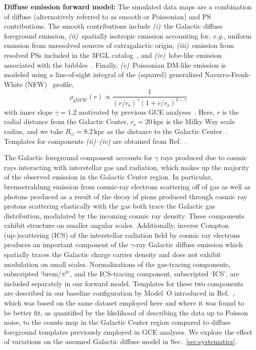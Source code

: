 \documentclass[prd,aps,10pt,nofootinbib,twocolumn,superscriptaddress,preprintnumbers,balancelastpage,longbibliography]{revtex4-1}
\begin{document}
\noindent
\textbf{Diffuse emission forward model:} The simulated data maps are a combination of diffuse (alternatively referred to as smooth or Poissonian) and PS contributions. The smooth contributions include \emph{(i)}~the Galactic diffuse foreground emission, \emph{(ii)}~spatially isotropic emission accounting for, \emph{e.g.}, uniform emission from unresolved sources of extragalactic origin, \emph{(iii)}~emission from resolved PSs included in the \Fermi 3FGL catalog~\cite{Fermi-LAT:2015bhf}, and \emph{(iv)}~lobe-like emission associated with the \Fermi bubbles~\cite{Su:2010qj}. Finally, \emph{(v)}~Poissonian DM-like emission is modeled using a line-of-sight integral of the (squared) generalized Navarro-Frenk-White (NFW)~\cite{Navarro:1995iw,Navarro:1996gj} profile,
\begin{equation}
\label{eq:nfw}
\rho_\mathrm{gNFW}(r) \propto \frac{1}{\left(r / r_{\mathrm s}\right)^{\gamma}\left(1+r / r_{\mathrm s}\right)^{3-\gamma}}
\end{equation}
with inner slope $\gamma=1.2$ motivated by previous GCE analyses~\cite{Gordon:2013vta,Daylan:2014rsa,Zhou:2014lva}. Here, $r$ is the radial distance from the Galactic Center, $r_{\mathrm s}=20\,\mathrm{kpc}$ is the Milky Way scale radius, and we take $R_\odot = 8.2\,\mathrm{kpc}$ as the distance to the Galactic Center~\cite{2020arXiv201202169B,2019A&A...625L..10G}. Templates for components \emph{(ii)--(iv)} are obtained from Ref.~\cite{Mishra-Sharma:2016gis}. 

The Galactic foreground component accounts for $\gamma$ rays produced due to cosmic rays interacting with interstellar gas and radiation, which makes up the majority of the observed emission in the Galactic Center region. In particular, bremsstrahlung emission from cosmic-ray electrons scattering off of gas as well as photons produced as a result of the decay of pions produced through cosmic ray protons scattering elastically with the gas both trace the Galactic gas distribution, modulated by the incoming cosmic ray density. These components exhibit structure on smaller angular scales. Additionally, inverse Compton (up-)scattering (ICS) of the interstellar radiation field by cosmic ray electrons produces an important component of the $\gamma$-ray Galactic diffuse emission which spatially traces the Galactic charge carrier density and does not exhibit modulation on small scales. Normalizations of the gas-tracing components, subscripted `brem/$\pi^0$', and the ICS-tracing component, subscripted `ICS', are included separately in our forward model. Templates for these two components are described in our baseline configuration by {Model~O} introduced in Ref.~\cite{Buschmann:2020adf}, which was based on the same \Fermi dataset employed here and where it was found to be better fit, as quantified by the likelihood of describing the data up to Poisson noise, to the counts map in the Galactic Center region compared to diffuse foreground templates previously employed in GCE analyses. We explore the effect of variations on the assumed Galactic diffuse model in Sec.~\ref{sec:systematics}. 
\end{document}
